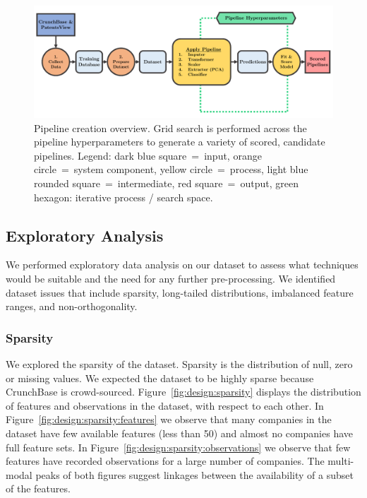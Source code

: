 \documentclass[../thesis/thesis.tex]{subfiles}
\begin{document}
\begin{figure}[!htb]
    \centering
    \includegraphics[width=\textwidth]{../figures/design/flowchart_pipeline_creation}
    \caption[Pipeline creation flowchart]{Pipeline creation overview. Grid search is performed across the pipeline hyperparameters to generate a variety of scored, candidate pipelines. Legend: dark blue square~=~input, orange circle~=~system component, yellow circle~=~process, light blue rounded square~=~intermediate, red square~=~output, green hexagon: iterative process / search space.}
    \label{fig:design:pipeline_creation}
\end{figure}

\subsection{Exploratory Analysis}

We performed exploratory data analysis on our dataset to assess what techniques would be suitable and the need for any further pre-processing. We identified dataset issues that include sparsity, long-tailed distributions, imbalanced feature ranges, and non-orthogonality.

\subsubsection{Sparsity}

We explored the sparsity of the dataset. Sparsity is the distribution of null, zero or missing values. We expected the dataset to be highly sparse because CrunchBase is crowd-sourced. Figure~\ref{fig:design:sparsity} displays the distribution of features and observations in the dataset, with respect to each other. In Figure~\ref{fig:design:sparsity:features} we observe that many companies in the dataset have few available features (less than 50) and almost no companies have full feature sets. In Figure~\ref{fig:design:sparsity:observations} we observe that few features have recorded observations for a large number of companies. The multi-modal peaks of both figures suggest linkages between the availability of a subset of the features.
\end{document}
